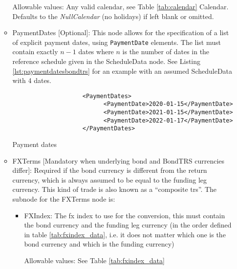 \begin{itemize}
\begin{itemize}
    Allowable values: Any valid calendar, see Table \ref{tab:calendar} Calendar. Defaults to the \emph{NullCalendar} (no holidays) if left blank or omitted.

  \item PaymentDates [Optional]: This node allows for the specification of a list of explicit payment dates, using \lstinline!PaymentDate! elements.
    The list must contain exactly $n-1$ dates where $n$ is the number of dates in the reference schedule given in the ScheduleData node.
    See Listing \ref{lst:paymentdatesbondtrs} for an example with an assumed ScheduleData with 4 dates.

  \begin{listing}[H]
    \begin{verbatim}
                    <PaymentDates>
                          <PaymentDate>2020-01-15</PaymentDate>
                          <PaymentDate>2021-01-15</PaymentDate>
                          <PaymentDate>2022-01-17</PaymentDate>
                    </PaymentDates>
    \end{verbatim}
    \caption{Payment dates}
    \label{lst:paymentdatesbondtrs}
  \end{listing}


  \item FXTerms [Mandatory when underlying bond and BondTRS currencies differ]: Required if the bond currency is different from the return currency, which is always
    assumed to be equal to the funding leg currency. This kind of trade is also known as a ``composite trs''. The
    subnode for the FXTerms node is:
    \begin{itemize}
      \item FXIndex: The fx index to use for the conversion, this must contain the bond currency and the funding leg
        currency (in the order defined in table \ref{tab:fxindex_data}, i.e. it does not matter which one is the bond currency and which is the funding currency)
        
        Allowable values: See Table \ref{tab:fxindex_data}
       
        
    \end{itemize}


\end{itemize}
\end{itemize}

